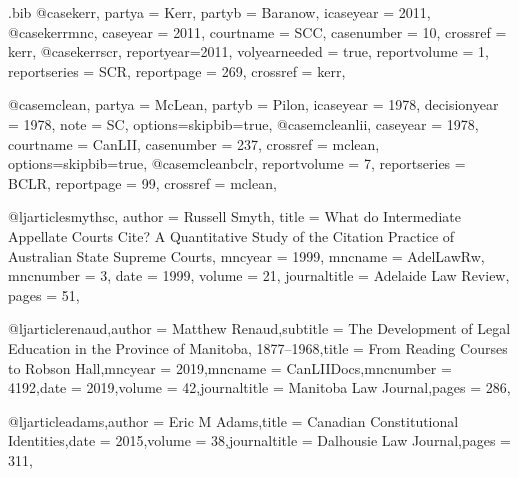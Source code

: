 \begin{filecontents*}[overwrite]{\jobname.bib}
@case{kerr,
  partya = {Kerr}, 
  partyb = {Baranow},
  icaseyear = {2011},
  }
@case{kerrmnc,
  caseyear = {2011},
  courtname = {SCC},
  casenumber = {10},
  crossref = {kerr},
  }
@case{kerrscr,
  reportyear={2011},
  volyearneeded = {true},
  reportvolume = {1},
  reportseries = {SCR},
  reportpage = {269},
  crossref = {kerr},
  }





@case{mclean,
  partya = {McLean}, 
  partyb = {Pilon},
  icaseyear = {1978},
  decisionyear = {1978},
  note = {SC},
  options={skipbib=true},
  }
@case{mcleanlii,
  caseyear = {1978},
  courtname = {CanLII},
  casenumber = {237},
  crossref = {mclean},
  options={skipbib=true},
  }
@case{mcleanbclr,
  reportvolume = {7},
  reportseries = {BCLR},
  reportpage = {99},
  crossref = {mclean},
  }








@ljarticle{smythsc,
author = {Russell Smyth},
title = {What do Intermediate Appellate Courts Cite? A Quantitative Study of the Citation Practice of Australian State Supreme Courts},
mncyear = {1999},
mncname = {AdelLawRw},
mncnumber = {3},
date = {1999},
volume = {21},
journaltitle = {Adelaide Law Review},
pages = {51},
}

@ljarticle{renaud,author = {Matthew Renaud},subtitle = {The Development of Legal Education in the Province of Manitoba, 1877–1968},title = {From Reading Courses to Robson Hall},mncyear = {2019},mncname = {CanLIIDocs},mncnumber = {4192},date = {2019},volume = {42},journaltitle = {Manitoba Law Journal},pages = {286},}

@ljarticle{adams,author = {Eric M Adams},title = {Canadian Constitutional Identities},date = {2015},volume = {38},journaltitle = {Dalhousie Law Journal},pages = {311},}



\end{filecontents*}
